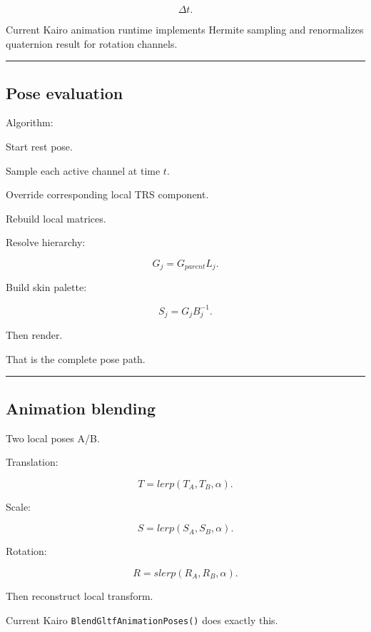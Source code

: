 \[
\Delta t.
\]

Current Kairo animation runtime implements Hermite sampling and renormalizes quaternion result for rotation channels.

\begin{center}\rule{0.5\linewidth}{0.5pt}\end{center}

\subsection{Pose evaluation}\label{04-visual-computing-ii-ch041-pose-evaluation}

\hypertarget{04-visual-computing-ii-ch041-pose-evaluation}{}

Algorithm:

Start rest pose.

Sample each active channel at time \(t\).

Override corresponding local TRS component.

Rebuild local matrices.

Resolve hierarchy:

\[
G_j=
G_{parent}L_j.
\]

Build skin palette:

\[
S_j=
G_jB_j^{-1}.
\]

Then render.

That is the complete pose path.

\begin{center}\rule{0.5\linewidth}{0.5pt}\end{center}

\subsection{Animation blending}\label{04-visual-computing-ii-ch041-animation-blending}

\hypertarget{04-visual-computing-ii-ch041-animation-blending}{}

Two local poses A/B.

Translation:

\[
T=
lerp(T_A,T_B,\alpha).
\]

Scale:

\[
S=
lerp(S_A,S_B,\alpha).
\]

Rotation:

\[
R=
slerp(R_A,R_B,\alpha).
\]

Then reconstruct local transform.

Current Kairo \texttt{BlendGltfAnimationPoses()} does exactly this.


